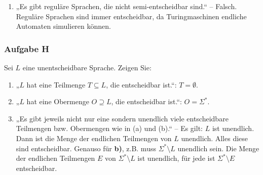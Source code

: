 \documentclass[a4paper,10pt]{article}
\begin{document}
\begin{enumerate}
            \item „Es gibt reguläre Sprachen, die nicht semi-entscheidbar sind.“ – Falsch. Reguläre Sprachen sind immer entscheidbar, da Turingmaschinen endliche Automaten simulieren können.
        \end{enumerate}

    \subsubsection*{Aufgabe H}
        Sei $L$ eine unentscheidbare Sprache. Zeigen Sie:

        \begin{enumerate}
            \item „$L$ hat eine Teilmenge $T \subseteq L$, die entscheidbar ist.“: $T = \emptyset$.
            \item „$L$ hat eine Obermenge $O \supseteq L$, die entscheidbar ist.“: $O = \Sigma^*$.
            \item „Es gibt jeweils nicht nur eine sondern unendlich viele entscheidbare Teilmengen bzw. Obermengen wie in (a) und (b).“ – Es gilt: $L$ ist unendlich. Dann ist die Menge der endlichen Teilmengen von $L$ unendlich. Alles diese sind entscheidbar. Genauso für \textbf{b)}, z.B. muss $\Sigma^*\setminus L$ unendlich sein. Die Menge der endlichen Teilmengen $E$ von $\Sigma^*\setminus L$ ist unendlich, für jede ist $\Sigma^*\setminus E$ entscheidbar.
        \end{enumerate}
\end{document}
